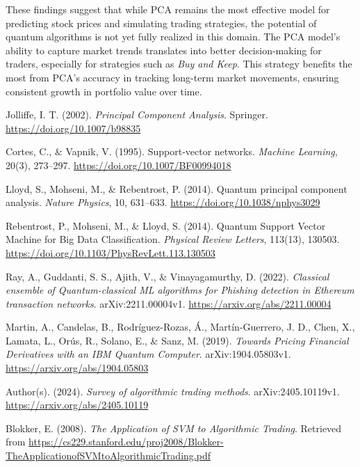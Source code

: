 \documentclass[journal]{IEEEtran}
\begin{document}
These findings suggest that while PCA remains the most effective model for predicting stock prices and simulating trading strategies, the potential of quantum algorithms is not yet fully realized in this domain. The PCA model’s ability to capture market trends translates into better decision-making for traders, especially for strategies such as \textit{Buy and Keep}. This strategy benefits the most from PCA's accuracy in tracking long-term market movements, ensuring consistent growth in portfolio value over time.

\begin{thebibliography}{99}

Jolliffe, I. T. (2002). \textit{Principal Component Analysis}. Springer. \url{https://doi.org/10.1007/b98835}

Cortes, C., \& Vapnik, V. (1995). Support-vector networks. \textit{Machine Learning}, 20(3), 273–297. \url{https://doi.org/10.1007/BF00994018}

Lloyd, S., Mohseni, M., \& Rebentrost, P. (2014). Quantum principal component analysis. \textit{Nature Physics}, 10, 631–633. \url{https://doi.org/10.1038/nphys3029}

Rebentrost, P., Mohseni, M., \& Lloyd, S. (2014). Quantum Support Vector Machine for Big Data Classification. \textit{Physical Review Letters}, 113(13), 130503. \url{https://doi.org/10.1103/PhysRevLett.113.130503}

Ray, A., Guddanti, S. S., Ajith, V., \& Vinayagamurthy, D. (2022). \textit{Classical ensemble of Quantum-classical ML algorithms for Phishing detection in Ethereum transaction networks}. arXiv:2211.00004v1. \url{https://arxiv.org/abs/2211.00004}

Martin, A., Candelas, B., Rodríguez-Rozas, Á., Martín-Guerrero, J. D., Chen, X., Lamata, L., Orús, R., Solano, E., \& Sanz, M. (2019). \textit{Towards Pricing Financial Derivatives with an IBM Quantum Computer}. arXiv:1904.05803v1. \url{https://arxiv.org/abs/1904.05803}

Author(s). (2024). \textit{Survey of algorithmic trading methods}. arXiv:2405.10119v1. \url{https://arxiv.org/abs/2405.10119}

Blokker, E. (2008). \textit{The Application of SVM to Algorithmic Trading}. Retrieved from \url{https://cs229.stanford.edu/proj2008/Blokker-TheApplicationofSVMtoAlgorithmicTrading.pdf}

\end{thebibliography}
\end{document}
